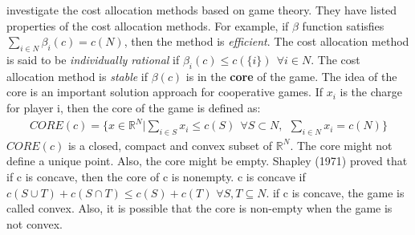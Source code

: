 \citet{Tijs} investigate the cost allocation methods based on game theory.  
They have listed properties of the cost allocation methods. For example, if $\beta$ 
function satisfies $\sum_{i \in N}\beta_i(c)=c(N)$, then the method is {\em efficient}.    
The cost allocation method is said to be {\em individually rational} if 
$\beta_i(c) \leq c(\{i\})\ \ \forall i \in N$. The cost allocation method is 
{\em stable} if $\beta(c)$ is in the {\bf core} of the game. The idea of the core is 
an important solution approach for cooperative games. If $x_i$ is the charge for 
player i, then the core of the game is defined as:
\begin{eqnarray}
\label{Core}
CORE(c) = \{ x \in \mathbb{R}^N | \sum_{i \in S}x_i \leq c(S) \ \ \forall S \subset N, \ \ \sum_{i \in N}x_i=c(N)\}               
\end {eqnarray}
$CORE(c)$ is a closed, compact and convex subset of $\mathbb{R}^N$. The core might not 
define a unique point. Also, the core might be empty. Shapley (1971) proved that if c is 
concave, then the core of c is nonempty. c is concave if 
$c(S \cup T)+c(S \cap T) \leq c(S)+c(T)$ $\forall S,T \subseteq N$. if c is concave, the 
game is called convex. Also, it is possible that the core is non-empty when the game 
is not convex.

